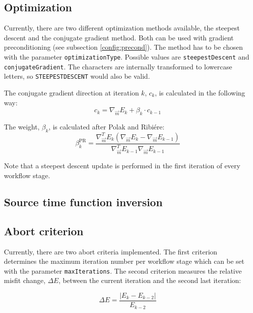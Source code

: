 \documentclass[pdftex,a4paper,parskip,listof=totoc,bibliography=totoc,onehalfspacing,12pt]{scrreprt}
\begin{document}
\subsection{Optimization}

Currently, there are two different optimization methods available, the steepest descent and the conjugate gradient method. Both can be used with gradient preconditioning (see subsection \ref{config:precond}). The method has to be chosen with the parameter \verb+optimizationType+. Possible values are \verb+steepestDescent+ and \verb+conjugateGradient+. The characters are internally transformed to lowercase letters, so \verb+STEEPESTDESCENT+ would also be valid.

The conjugate gradient direction at iteration $k$, $c_k$, is calculated in the following way:
\begin{equation*}
 c_k =  \nabla_{\vec{m}} E_k + \beta_k \cdot c_{k-1}
\end{equation*}

The weight, $\beta_k$, is calculated after Polak and Ribi\'{e}re:
\begin{equation*}
 \beta_k^{\mathrm{PR}} = \frac{ \nabla_{\vec{m}}^T E_k (\nabla_{\vec{m}} E_k - \nabla_{\vec{m}} E_{k-1}) }{\nabla_{\vec{m}}^T E_{k-1} \nabla_{\vec{m}} E_{k-1}}
\end{equation*}

Note that a steepest descent update is performed in the first iteration of every workflow stage.

\subsection{Source time function inversion}

\subsection{Abort criterion}
\label{config:abort}

Currently, there are two abort criteria implemented. The first criterion determines the maximum iteration number per workflow stage which can be set with the parameter \verb+maxIterations+. The second criterion measures the relative misfit change, $\Delta E$, between the current iteration and the second last iteration:

\begin{equation*}
 \Delta E = \frac{|E_k-E_{k-2}|}{E_{k-2}}
\end{equation*}
\end{document}
